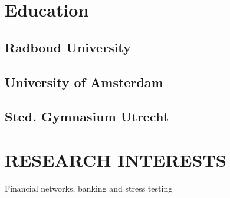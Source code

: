 \documentclass[]{deedy-resume-reversed}
\begin{document}
\hfill
\begin{minipage}[t]{0.33\textwidth}


\section{Education}

\subsection{Radboud University}
\sectionsep

\subsection{University of Amsterdam}
\sectionsep

\subsection{Sted. Gymnasium Utrecht}

\sectionsep

\vspace{2pt}
\section{RESEARCH INTERESTS}
Financial networks, banking and stress testing

\sectionsep


\end{minipage}
\end{document}
